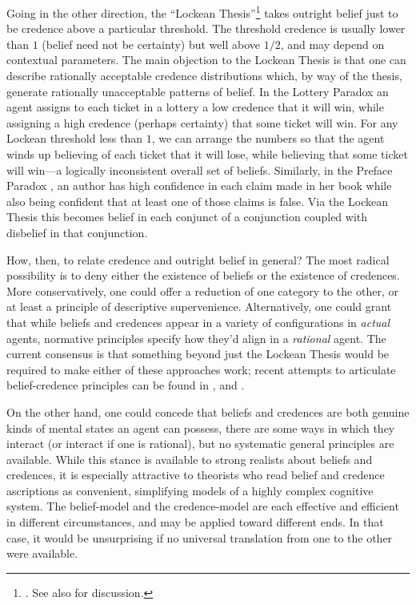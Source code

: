 Going in the other direction, the ``Lockean Thesis''\footnote
{\citet[Bk.\ IV]{LockeEssay}. See also \citet{FoleyNet} for discussion.}
 takes outright belief just to be credence above a particular threshold. The threshold credence is usually lower than $1$ (belief need not be certainty) but well above $1/2$, and may depend on contextual parameters. The main objection to the Lockean Thesis is that one can describe rationally acceptable credence distributions which, by way of the thesis, generate rationally unacceptable patterns of belief. In the Lottery Paradox \citep{KyburgProbability}\label{titelbaum-lottery} an agent assigns to each ticket in a lottery a low credence that it will win, while assigning a high credence (perhaps certainty) that some ticket will win. For any Lockean threshold less than $1$, we can arrange the numbers so that the agent winds up believing of each ticket that it will lose, while believing that some ticket will win---a logically inconsistent overall set of beliefs. Similarly, in the Preface Paradox \citep{MakinsonPreface}, an author has high confidence in each claim made in her book while also being confident that at least one of those claims is false. Via the Lockean Thesis this becomes belief in each conjunct of a conjunction coupled with disbelief in that conjunction.
 
How, then, to relate credence and outright belief in general? The most radical possibility is to deny either the existence of beliefs or the existence of credences. More conservatively, one could offer a reduction of one category to the other, or at least a principle of descriptive supervenience. Alternatively, one could grant that while beliefs and credences appear in a variety of configurations in \emph{actual} agents, normative principles specify how they'd align in a \emph{rational} agent. The current consensus is that something beyond just the Lockean Thesis would be required to make either of these approaches work; recent attempts to articulate belief-credence principles can be found in \citet{LeitgebStability,DouvenPragmatics}, and \citet{LinKellyGeological}.

On the other hand, one could concede that beliefs and credences are both genuine kinds of mental states an agent can possess, there are some ways in which they interact (or interact if one is rational), but no systematic general principles are available. While this stance is available to strong realists about beliefs and credences, it is especially attractive to theorists who read belief and credence ascriptions as convenient, simplifying models of a highly complex cognitive system. The belief-model and the credence-model are each effective and efficient in different circumstances, and may be applied toward different ends. In that case, it would be unsurprising if no universal translation from one to the other were available.  
 


